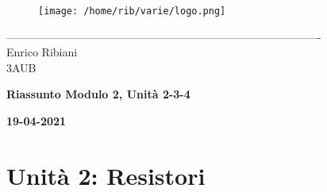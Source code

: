 \documentclass{article}
\begin{document}
    \begin{titlepage}
    \begin{center}
\begin{figure}
    \centering
    \texttt{[image: /home/rib/varie/logo.png]}
    \label{fig:logo}
\end{figure}
-------------------------------------------------------------------------------------\\
\vspace{2\baselineskip}
\large Enrico Ribiani\\
\large 3AUB\\
\vfill

\Huge{\textbf{Riassunto Modulo 2, Unità 2-3-4}}\\
\vfill

\LARGE{\textbf{19-04-2021}}\\
\end{center}
\end{titlepage}
\tableofcontents
\vspace{3\baselineskip}

\section{Unità 2: Resistori}
\end{document}
